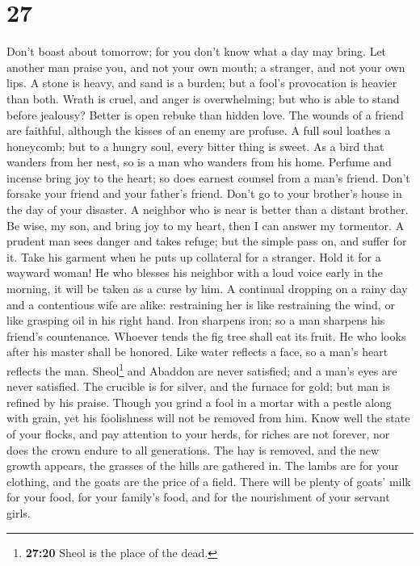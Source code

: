 \hypertarget{section-22}{%
\section{27}\label{section-22}}

 Don't boast about tomorrow; for you don't know what a day
may bring.  Let another man praise you, and not your own
mouth; a stranger, and not your own lips.  A stone is
heavy, and sand is a burden; but a fool's provocation is heavier than
both.  Wrath is cruel, and anger is overwhelming; but who
is able to stand before jealousy?  Better is open rebuke
than hidden love.  The wounds of a friend are faithful,
although the kisses of an enemy are profuse.  A full soul
loathes a honeycomb; but to a hungry soul, every bitter thing is sweet.
 As a bird that wanders from her nest, so is a man who
wanders from his home.  Perfume and incense bring joy to
the heart; so does earnest counsel from a man's friend. 
Don't forsake your friend and your father's friend. Don't go to your
brother's house in the day of your disaster. A neighbor who is near is
better than a distant brother.  Be wise, my son, and
bring joy to my heart, then I can answer my tormentor.  A
prudent man sees danger and takes refuge; but the simple pass on, and
suffer for it.  Take his garment when he puts up
collateral for a stranger. Hold it for a wayward woman! 
He who blesses his neighbor with a loud voice early in the morning, it
will be taken as a curse by him.  A continual dropping on
a rainy day and a contentious wife are alike: 
restraining her is like restraining the wind, or like grasping oil in
his right hand.  Iron sharpens iron; so a man sharpens
his friend's countenance.  Whoever tends the fig tree
shall eat its fruit. He who looks after his master shall be honored.
 Like water reflects a face, so a man's heart reflects
the man.  Sheol\footnote{\textbf{27:20} Sheol is the
  place of the dead.} and Abaddon are never satisfied; and a man's eyes
are never satisfied.  The crucible is for silver, and the
furnace for gold; but man is refined by his praise. 
Though you grind a fool in a mortar with a pestle along with grain, yet
his foolishness will not be removed from him.  Know well
the state of your flocks, and pay attention to your herds,
 for riches are not forever, nor does the crown endure to
all generations.  The hay is removed, and the new growth
appears, the grasses of the hills are gathered in.  The
lambs are for your clothing, and the goats are the price of a field.
 There will be plenty of goats' milk for your food, for
your family's food, and for the nourishment of your servant girls.

